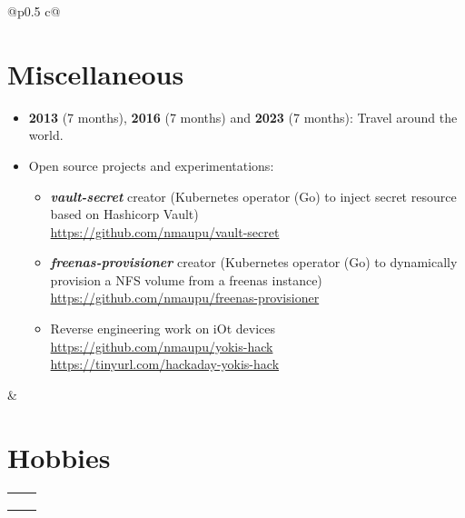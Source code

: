 \documentclass[darkhipster]{hipstercv}
\newcommand{\cvsection}[1] {%
    \section*{\textbf{#1}}
}%
\renewcommand{\hobbyicon}[5]{%
    \begin{tikzpicture}%
        \draw[draw=none,fill=#3,opacity=.55] (0,0) circle (0.58);%
        \node[](icon) at (0,0) {#4#1};%
        \node[below=#5,align=center] at (icon) {#2};%
    \end{tikzpicture}
}
\begin{document}
\begin{paracol}{2}
\begin{tabular}[t]{@{}p{} c@{}}
{\begin{minipage}[t]{0.5\textwidth}
\vspace{1.5em}

\cvsection{Miscellaneous}
\small
\begin{itemize}
    \item {\bfseries{2013}} (7 months), {\bfseries{2016}} (7 months) and {\bfseries{2023}} (7 months): Travel around the world.
    \item Open source projects and experimentations:
    \begin{itemize}
        \item \emph{\bfseries{vault-secret}} creator (Kubernetes operator (Go) to inject secret resource based on Hashicorp Vault) \\ {\footnotesize \url{https://github.com/nmaupu/vault-secret}}
        \item \emph{\bfseries{freenas-provisioner}} creator (Kubernetes operator (Go) to dynamically provision a NFS volume from a freenas instance) \\ {\footnotesize \url{https://github.com/nmaupu/freenas-provisioner}}
        \item Reverse engineering work on iOt devices \\ {\footnotesize \url{https://github.com/nmaupu/yokis-hack}} \\ {\footnotesize \url{https://tinyurl.com/hackaday-yokis-hack}}
    \end{itemize}
\end{itemize}

\end{minipage}
} & {
\begin{minipage}[t]{0.19\textwidth}
\cvsection{Hobbies}
    \begin{tabular}[t]{cc}
    \hobbyicon{\color{iconcolour}\faPlane}{Travel}{cvgreen}{\iconsize}{2em} &
    \hobbyicon{\color{iconcolour}\faCamera}{Photo}{cvorange}{\iconsize}{2em} \\
    \hobbyicon{\color{iconcolour}\faWrench}{DIY}{cvpurple}{\iconsize}{2em} &
    \hobbyicon{\color{iconcolour}\faChessPawn}{Chess}{lightgray}{\iconsize}{2em} \\
    \hobbyicon{\color{iconcolour}\faGamepad}{Games}{red}{\iconsize}{2em} &
    \hobbyicon{\color{iconcolour}\faMountain}{Climbing}{cyan}{\iconsize}{2em} \\
    \end{tabular}
\end{minipage}
} \\

\end{tabular}

\end{paracol}
\end{document}
